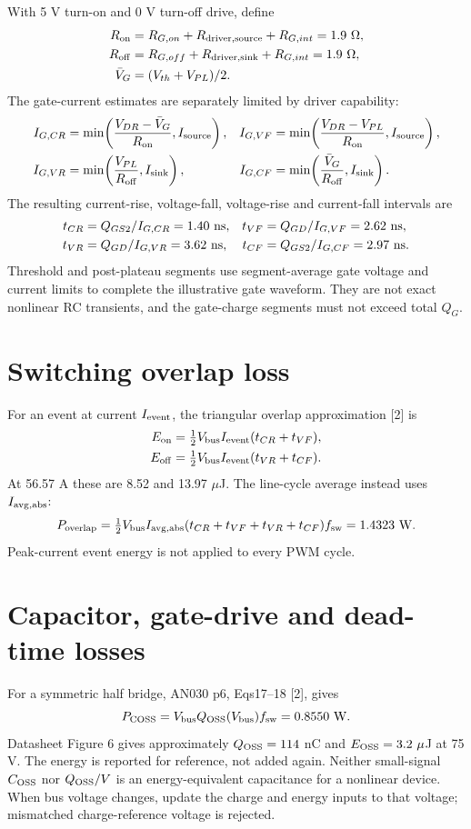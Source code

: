 \documentclass[11pt,a4paper]{article}
\begin{document}
With 5 V turn-on and 0 V turn-off drive, define
\begin{align*}
 R_{\rm on}&=R_{G,on}+R_{\rm driver,source}+R_{G,int}=1.9\ \Omega,\\
 R_{\rm off}&=R_{G,off}+R_{\rm driver,sink}+R_{G,int}=1.9\ \Omega,\\
 \bar V_G&=(V_{th}+V_{PL})/2.
\end{align*}
The gate-current estimates are separately limited by driver capability:
\begin{align*}
 I_{G,CR}&=\min\!\left(\frac{V_{DR}-\bar V_G}{R_{\rm on}},I_{\rm source}\right), &
 I_{G,VF}&=\min\!\left(\frac{V_{DR}-V_{PL}}{R_{\rm on}},I_{\rm source}\right),\\
 I_{G,VR}&=\min\!\left(\frac{V_{PL}}{R_{\rm off}},I_{\rm sink}\right), &
 I_{G,CF}&=\min\!\left(\frac{\bar V_G}{R_{\rm off}},I_{\rm sink}\right).
\end{align*}
The resulting current-rise, voltage-fall, voltage-rise and current-fall intervals are
\begin{align*}
 t_{CR}&=Q_{GS2}/I_{G,CR}=1.40\ {\rm ns}, &
 t_{VF}&=Q_{GD}/I_{G,VF}=2.62\ {\rm ns},\\
 t_{VR}&=Q_{GD}/I_{G,VR}=3.62\ {\rm ns}, &
 t_{CF}&=Q_{GS2}/I_{G,CF}=2.97\ {\rm ns}.
\end{align*}
Threshold and post-plateau segments use segment-average gate voltage and current
limits to complete the illustrative gate waveform. They are not exact nonlinear RC
transients, and the gate-charge segments must not exceed total $Q_G$.

\section{Switching overlap loss}
For an event at current $I_{\rm event}$, the triangular overlap approximation [2] is
\begin{align*}
 E_{\rm on}&=\tfrac12 V_{\rm bus}I_{\rm event}(t_{CR}+t_{VF}),\\
 E_{\rm off}&=\tfrac12 V_{\rm bus}I_{\rm event}(t_{VR}+t_{CF}).
\end{align*}
At 56.57 A these are 8.52 and 13.97 $\mu$J. The line-cycle average instead uses
$I_{\rm avg,abs}$:
\[
 P_{\rm overlap}=\tfrac12 V_{\rm bus}I_{\rm avg,abs}
 (t_{CR}+t_{VF}+t_{VR}+t_{CF})f_{\rm sw}=1.4323\ {\rm W}.
\]
Peak-current event energy is not applied to every PWM cycle.

\newpage
\section{Capacitor, gate-drive and dead-time losses}
For a symmetric half bridge, AN030 p6, Eqs17--18 [2], gives
\[
 P_{\rm COSS}=V_{\rm bus}Q_{\rm OSS}(V_{\rm bus})f_{\rm sw}=0.8550\ {\rm W}.
\]
Datasheet Figure 6 gives approximately $Q_{\rm OSS}=114$ nC and
$E_{\rm OSS}=3.2\ \mu$J at 75 V. The energy is reported for reference, not added
again. Neither small-signal $C_{\rm OSS}$ nor $Q_{\rm OSS}/V$ is an energy-equivalent
capacitance for a nonlinear device. When bus voltage changes, update the charge
and energy inputs to that voltage; mismatched charge-reference voltage is rejected.
\end{document}
